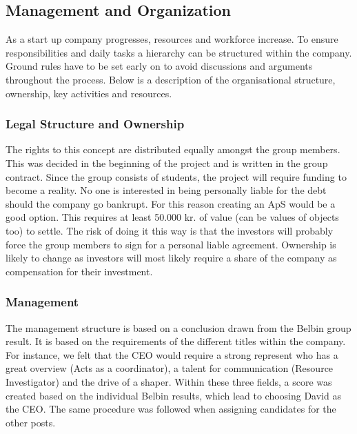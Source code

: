 \subsection{Management and Organization}
\label{sec:managementOrganization}
As a start up company progresses, resources and workforce increase. To ensure responsibilities and daily tasks a hierarchy can be structured within the company. Ground rules have to be set early on to avoid discussions and arguments throughout the process. Below is a description of the organisational structure, ownership, key activities and resources.

\subsubsection{Legal Structure and Ownership}
The rights to this concept are distributed equally amongst the group members. 
This was decided in the beginning of the project and is written in the group contract.
Since the group consists of students, the project will require funding to become a reality. No one is interested in being personally liable for the debt should the company go bankrupt. 
For this reason creating an ApS would be a good option. 
This requires at least 50.000 kr. of value (can be values of objects too) to settle. The risk of doing it this way is that the investors will probably force the group members to sign for a personal liable agreement. 
Ownership is likely to change as investors will most likely require a share of the company as compensation for their investment.

\subsubsection{Management}
The management structure is based on a conclusion drawn from the Belbin group result. It is based on the requirements of the different titles within the company. For instance, we felt that the CEO would require a strong represent who has a great overview (Acts as a coordinator), a talent for communication (Resource Investigator) and the drive of a shaper. Within these three fields, a score was created based on the individual Belbin results, which lead to choosing David as the CEO. 
The same procedure was followed when assigning candidates for the other posts. 

